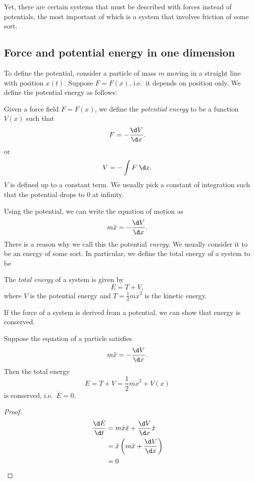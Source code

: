\documentclass[a4paper]{article}
\begin{document}
Yet, there are certain systems that must be described with forces instead of potentials, the most important of which is a system that involves friction of some sort.

\subsection{Force and potential energy in one dimension}
To define the potential, consider a particle of mass $m$ moving in a straight line with position $x(t)$. Suppose $F = F(x)$, i.e.\ it depends on position only. We define the potential energy as follows:
\begin{defi}
  Given a force field $F = F(x)$, we define the \emph{potential energy} to be a function $V(x)$ such that
  \[
    F = -\frac{\d V}{\d x}.
  \]
  or
  \[
    V = -\int F \;\d x.
  \]
  $V$ is defined up to a constant term. We usually pick a constant of integration such that the potential drops to $0$ at infinity.
\end{defi}
Using the potential, we can write the equation of motion as
\[
  m\ddot{x} = -\frac{\d V}{\d x}.
\]
There is a reason why we call this the potential \emph{energy}. We usually consider it to be an energy of some sort. In particular, we define the total energy of a system to be
\begin{defi}
  The \emph{total energy} of a system is given by
  \[
    E = T + V,
  \]
  where $V$ is the potential energy and $T = \frac{1}{2}m\dot{x}^2$ is the kinetic energy.
\end{defi}
If the force of a system is derived from a potential, we can show that energy is conserved.
\begin{prop}
  Suppose the equation of a particle satisfies
  \[
    m\ddot{x} = -\frac{\d V}{\d x}.
  \]
  Then the total energy
  \[
    E = T + V = \frac{1}{2} m\dot{x}^2 + V(x)
  \]
  is conserved, i.e.\ $\dot{E} = 0$.
\end{prop}

\begin{proof}
  \begin{align*}
    \frac{\d E}{\d t} &= m\dot{x}\ddot{x} + \frac{\d V}{\d x}\dot{x}\\
    &= \dot{x}\left(m\ddot{x} + \frac{\d V}{\d x}\right)\\
    &= 0\qedhere
  \end{align*}
\end{proof}
\end{document}
